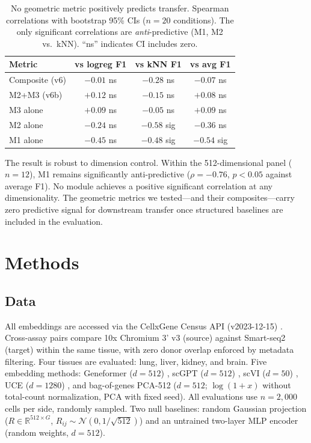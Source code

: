 \documentclass[9pt,lineno]{elife}
\begin{document}
\begin{table}[t]
\centering
\caption{No geometric metric positively predicts transfer. Spearman correlations with bootstrap 95\% CIs ($n = 20$ conditions). The only significant correlations are \emph{anti}-predictive (M1, M2 vs.\ kNN). ``ns'' indicates CI includes zero.}
\label{tab:probes}
\small
\begin{tabular}{@{}lccc@{}}
\toprule
Metric & vs logreg F1 & vs kNN F1 & vs avg F1 \\
\midrule
Composite (v6) & $-0.01$ ns & $-0.28$ ns & $-0.07$ ns \\
M2+M3 (v6b) & $+0.12$ ns & $-0.15$ ns & $+0.08$ ns \\
M3 alone & $+0.09$ ns & $-0.05$ ns & $+0.09$ ns \\
M2 alone & $-0.24$ ns & $\mathbf{-0.58}$ sig & $-0.36$ ns \\
M1 alone & $-0.45$ ns & $\mathbf{-0.48}$ sig & $\mathbf{-0.54}$ sig \\
\bottomrule
\end{tabular}
\end{table}

The result is robust to dimension control. Within the 512-dimensional panel ($n = 12$), M1 remains significantly anti-predictive ($\rho = -0.76$, $p < 0.05$ against average F1). No module achieves a positive significant correlation at any dimensionality. The geometric metrics we tested---and their composites---carry zero predictive signal for downstream transfer once structured baselines are included in the evaluation.


\section{Methods}

\subsection{Data}

All embeddings are accessed via the CellxGene Census API (v2023-12-15) \citep{abdulla2025cellxgene}. Cross-assay pairs compare 10x Chromium 3' v3 (source) against Smart-seq2 (target) within the same tissue, with zero donor overlap enforced by metadata filtering. Four tissues are evaluated: lung, liver, kidney, and brain. Five embedding methods: Geneformer ($d = 512$) \citep{theodoris2023geneformer}, scGPT ($d = 512$) \citep{cui2024scgpt}, scVI ($d = 50$) \citep{lopez2018scvi}, UCE ($d = 1280$) \citep{rosen2026uce}, and bag-of-genes PCA-512 ($d = 512$; $\log(1 + x)$ without total-count normalization, PCA with fixed seed). All evaluations use $n = 2{,}000$ cells per side, randomly sampled. Two null baselines: random Gaussian projection ($R \in \mathbb{R}^{512 \times G}$, $R_{ij} \sim \mathcal{N}(0, 1/\sqrt{512})$) and an untrained two-layer MLP encoder (random weights, $d = 512$).
\end{document}
